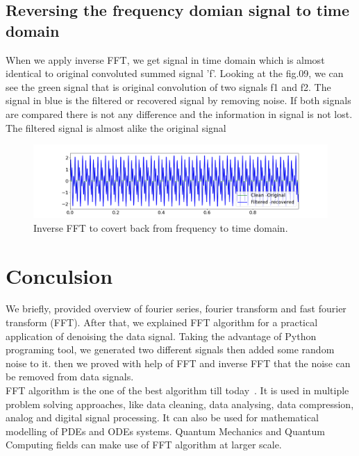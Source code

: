 \documentclass[a4paper, 12pt]{scrartcl}
\begin{document}
  \subsection{Reversing the frequency domian signal to time domain}

    When we apply inverse FFT, we get signal in time domain which is almost identical to original convoluted summed signal 'f'.
Looking at the fig.09, we can see the green signal that is original convolution of two signals f1 and f2. 
The signal in blue is the filtered or recovered signal by removing noise. If both signals are compared there is not any difference and the information in signal is not lost. 
The filtered signal is almost alike the original signal 
\begin{figure}[H] 
  \centering
  \includegraphics[width=\textwidth]{img/fft_infft_signals.png}
  \caption{Inverse FFT to covert back from frequency to time domain.}
  \label{fig:fft_infft_signals}
\end{figure}

\section{Conculsion}
We briefly, provided overview of fourier series, fourier transform and fast fourier transform (FFT). 
After that, we explained FFT algorithm for a practical application of denoising the data signal. Taking the advantage of Python programing tool, we generated two different signals then added some random noise to it.
then we proved with help of FFT and inverse FFT that the noise can be removed from data signals.\\
FFT algorithm is the one of the best algorithm till today~\cite{fftalg}. 
It is used in multiple problem solving approaches, like data cleaning, data analysing, data compression, analog and digital signal processing. It can also be used for mathematical modelling of PDEs and ODEs systems.
Quantum Mechanics and Quantum Computing fields can make use of FFT algorithm at larger scale.

    \newpage


  
\end{document}
